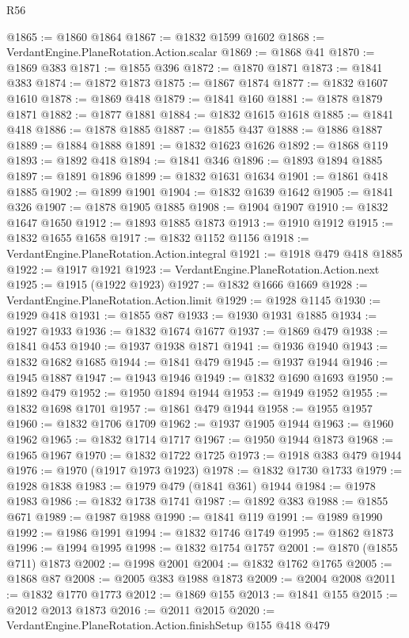 \begin{lexlean}{R56}
\begin{coremodule}
@1865 := @1860 @1864
@1867 := @1832 @1599 @1602
@1868 := VerdantEngine.PlaneRotation.Action.scalar
@1869 := @1868 @41
@1870 := @1869 @383
@1871 := @1855 @396
@1872 := @1870 @1871
@1873 := @1841 @383
@1874 := @1872 @1873
@1875 := @1867 @1874
@1877 := @1832 @1607 @1610
@1878 := @1869 @418
@1879 := @1841 @160
@1881 := @1878 @1879 @1871
@1882 := @1877 @1881
@1884 := @1832 @1615 @1618
@1885 := @1841 @418
@1886 := @1878 @1885
@1887 := @1855 @437
@1888 := @1886 @1887
@1889 := @1884 @1888
@1891 := @1832 @1623 @1626
@1892 := @1868 @119
@1893 := @1892 @418
@1894 := @1841 @346
@1896 := @1893 @1894 @1885
@1897 := @1891 @1896
@1899 := @1832 @1631 @1634
@1901 := @1861 @418 @1885
@1902 := @1899 @1901
@1904 := @1832 @1639 @1642
@1905 := @1841 @326
@1907 := @1878 @1905 @1885
@1908 := @1904 @1907
@1910 := @1832 @1647 @1650
@1912 := @1893 @1885 @1873
@1913 := @1910 @1912
@1915 := @1832 @1655 @1658
@1917 := @1832 @1152 @1156
@1918 := VerdantEngine.PlaneRotation.Action.integral
@1921 := @1918 @479 @418 @1885
@1922 := @1917 @1921
@1923 := VerdantEngine.PlaneRotation.Action.next
@1925 := @1915 (@1922 @1923)
@1927 := @1832 @1666 @1669
@1928 := VerdantEngine.PlaneRotation.Action.limit
@1929 := @1928 @1145
@1930 := @1929 @418
@1931 := @1855 @87
@1933 := @1930 @1931 @1885
@1934 := @1927 @1933
@1936 := @1832 @1674 @1677
@1937 := @1869 @479
@1938 := @1841 @453
@1940 := @1937 @1938 @1871
@1941 := @1936 @1940
@1943 := @1832 @1682 @1685
@1944 := @1841 @479
@1945 := @1937 @1944
@1946 := @1945 @1887
@1947 := @1943 @1946
@1949 := @1832 @1690 @1693
@1950 := @1892 @479
@1952 := @1950 @1894 @1944
@1953 := @1949 @1952
@1955 := @1832 @1698 @1701
@1957 := @1861 @479 @1944
@1958 := @1955 @1957
@1960 := @1832 @1706 @1709
@1962 := @1937 @1905 @1944
@1963 := @1960 @1962
@1965 := @1832 @1714 @1717
@1967 := @1950 @1944 @1873
@1968 := @1965 @1967
@1970 := @1832 @1722 @1725
@1973 := @1918 @383 @479 @1944
@1976 := @1970 (@1917 @1973 @1923)
@1978 := @1832 @1730 @1733
@1979 := @1928 @1838
@1983 := @1979 @479 (@1841 @361) @1944
@1984 := @1978 @1983
@1986 := @1832 @1738 @1741
@1987 := @1892 @383
@1988 := @1855 @671
@1989 := @1987 @1988
@1990 := @1841 @119
@1991 := @1989 @1990
@1992 := @1986 @1991
@1994 := @1832 @1746 @1749
@1995 := @1862 @1873
@1996 := @1994 @1995
@1998 := @1832 @1754 @1757
@2001 := @1870 (@1855 @711) @1873
@2002 := @1998 @2001
@2004 := @1832 @1762 @1765
@2005 := @1868 @87
@2008 := @2005 @383 @1988 @1873
@2009 := @2004 @2008
@2011 := @1832 @1770 @1773
@2012 := @1869 @155
@2013 := @1841 @155
@2015 := @2012 @2013 @1873
@2016 := @2011 @2015
@2020 := VerdantEngine.PlaneRotation.Action.finishSetup @155 @418 @479

\end{coremodule}
\end{lexlean}
